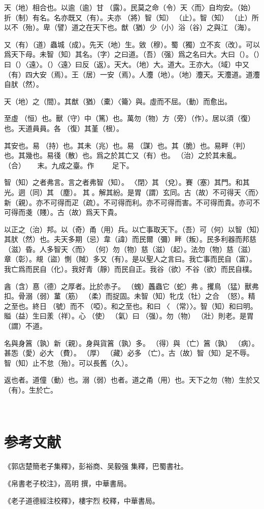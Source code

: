 \documentclass[a4paper]{ctexart}
\begin{document}
    天（地）相合也。以逾（逾）甘𩂣（露）。民莫之命（令）天〈而〉自均安。（始）折（制）有名。名亦既又（有）。夫亦𨟻（將）智（知）𣥕（止）。智（知）𣥕（止）所以不（殆）。卑（譬）道之在天下也。猷（猶）少（小）浴（谷）之與江𣳠（海）。

    又（有）（道）蟲城（成）。先天（地）生。敓（穆）。蜀（獨）立不亥（改）。可以爲天下母。未智（知）其名。（字）之曰道。（吾）（强）爲之名曰大。大曰（）。（）曰（）〈遠〉。（）〈遠〉曰反（返）。天大。（地）大。道大。王亦大。（域）中又（有）四大安（焉）。王（居）一安（焉）。人灋（地）。（地）灋天。天灋道。道灋自肰（然）。

    天（地）之（間）。其猷（猶）（橐）〈籥〉與。虛而不屈。（動）而愈出。

    至虛𠄨（恒）也。獸（守）中（篤）也。萬勿（物）方（旁）（作）。居以須（復）也。天道員員。各󵯿（復）其堇（根）。

    其安也。易𣏔（持）也。其未（兆）也。易𢘃（謀）也。其（脆）也。易畔（判）也。其幾也。易㣤（散）也。爲之於其亡又（有）也。𥿆（治）之於其未亂。𣌭（合）☐☐☐☐☐☐末。九成之臺。作☐☐☐☐☐☐☐☐☐足下。

    智（知）之者弗言。言之者弗智（知）。𨳮〈閉〉其𨓚（兌）。賽（塞）其門。和其光。迵（同）其󶴤（塵）。󶴤其󶩴。解其紛。是胃（謂）玄同。古（故）不可得天〈而〉新（親）。亦不可得而疋（疏）。不可得而利。亦不可得而害。不可得而貴。亦可不可得而戔（賤）。古（故）爲天下貴。

    以正之（治）邦。以（奇）甬（用）兵。以亡事取天下。（吾）可（何）以智（知）其肰（然）也。夫天多期（忌）韋（諱）而民爾（彌）畔（叛）。民多利器而邦慈（滋）昏。人多智天〈而〉𢦪（何）勿（物）慈（滋）（起）。法勿（物）慈（滋）章（彰）。覜（盜）惻（賊）多又（有）。是以聖人之言曰。我亡事而民自（富）。我亡爲而民自（化）。我好青（靜）而民自正。我谷（欲）不谷（欲）而民自樸。

    酓（含）惪（德）之厚者。比於赤子。󶵎（螝）䘍蟲它（蛇）弗𧍷。攫鳥󶵏（猛）獸弗扣。骨溺（弱）蓳（筋）󶵐（柔）而捉固。未智（知）牝戊（牡）之合󶵑󶵒（怒）。精之至也。終日󶴋（號）而不𪬐（啞）。和之至也。和曰󶵓〈󼲗（常）〉。智（知）和曰明。賹（益）生曰羕（祥）。心󶴎（使）󶴓（氣）曰󶴔（强）。勿（物）𡒉（壯）則老。是胃（謂）不道。

    名與身䈞（孰）新（親）。身與貨䈞（孰）多。󰴼（得）與󶵔（亡）䈞（孰）󶓄（病）。甚㤅（愛）必大󶵖（費）。󶵗（厚）󶤖（藏）必多󶵔（亡）。古（故）智（知）足不辱。智（知）止不怠（殆）。可以長舊（久）。

    返也者。道僮（動）也。溺（弱）也者。道之甬（用）也。天下之勿（物）生於又（有）。生於亡。

    𣏔（持）而浧（盈）之。不不若已。湍而群之。不可長保也。金玉浧（盈）室。莫能獸（守）也。貴（富）喬（驕）。自遺咎也。攻（功）述（遂）身退。天之道也。

    \section*{参考文献}
    《郭店楚簡老子集釋》，彭裕商、吴毅强 集釋，巴蜀書社。

    《帛書老子校注》，高明 撰，中華書局。

    《老子道德經注校釋》，樓宇烈 校釋，中華書局。
\end{document}
